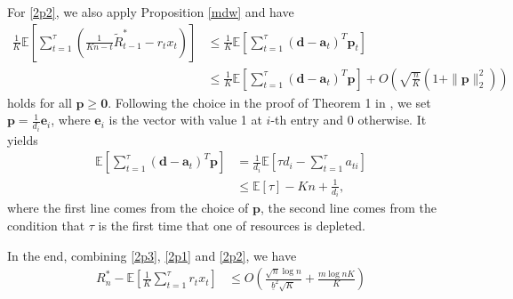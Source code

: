 \documentclass{article} %
\begin{document}
\begin{APPENDICES}
    For \eqref{2p2}, we also apply Proposition \ref{mdw} and have
                \begin{align*}
                    \frac{1}{K}\mathbb{E}\left[\sum\limits_{t=1}^{\tau}\left(\frac{1}{Kn-t}\tilde{R}_{t-1}^*-r_{t}x_{t}\right)
                    \right]
                   &\leq \frac{1}{K}\mathbb{E}\left[\sum\limits_{t=1}^{\tau}(\bm{d}-\bm{a}_t)^T\bm{p}_t\right]\\
                    &\leq
                    \frac{1}{K}\mathbb{E}\left[\sum\limits_{t=1}^{\tau}(\bm{d}-\bm{a}_t)^T\bm{p}\right]+O\left(\sqrt{\frac{n}{K}}(1+\|\bm{p}\|_2^2)\right)
                \end{align*}    
    holds for all $\bm{p}\geq \bm{0}$. Following the choice in the proof of Theorem 1 in \cite{balseiro2020best}, we set $\bm{p}=\frac{1}{d_i}\bm{e}_i$, where $\bm{e}_i$ is the vector with value 1 at $i$-th entry and 0 otherwise. It yields
    \begin{align*}
        \mathbb{E}\left[\sum\limits_{t=1}^{\tau}(\bm{d}-\bm{a}_t)^T\bm{p}\right]
        &=
        \frac{1}{d_i}\mathbb{E}\left[\tau d_i-\sum\limits_{t=1}^{\tau}a_{ti}\right]\\
        &\leq
        \mathbb{E}[\tau]-Kn+\frac{1}{d_i},
    \end{align*}
    where the first line comes from the choice of $\bm{p}$, the second line comes from the condition that $\tau$ is the first time that one of resources is depleted. 
    
    In the end, combining \eqref{2p3}, \eqref{2p1} and \eqref{2p2}, we have 
    \begin{align*}
        R_n^*-\mathbb{E}\left[\frac{1}{K}\sum\limits_{t=1}^{\tau}r_{t}x_{t}\right]\nonumber
        &\leq
        O\left(\frac{\sqrt{n}\log n}{\underline{b}^2\sqrt{K}}  +\frac{m\log nK}{K}\right)
    \end{align*}
\end{APPENDICES}



\end{document}

